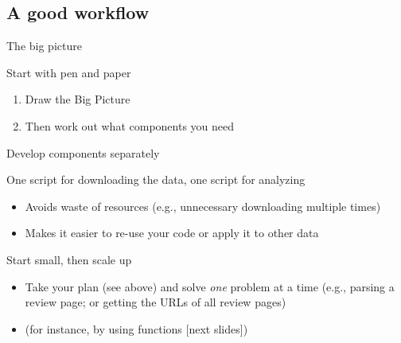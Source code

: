 \begin{frame}[plain]
\end{frame}

\subsection{A good workflow}




\begin{frame}{The big picture}
	\begin{block}{Start with pen and paper}
		\begin{enumerate}[<+->]
			\item Draw the Big Picture
			\item Then work out what components you need
		\end{enumerate}
	\end{block}
\end{frame}




\begin{frame}{Develop components separately}
	\begin{block}{One script for downloading the data, one script for analyzing}
		\begin{itemize}[<+->]
			\item Avoids waste of resources (e.g., unnecessary downloading multiple times)
			\item Makes it easier to re-use your code or apply it to other data
		\end{itemize}
	\end{block}
	\pause
	\begin{block}{Start small, then scale up}
		\begin{itemize}[<+->]
			\item Take your plan (see above) and solve \textit{one} problem at a time (e.g., parsing a review page; or getting the URLs of all review pages)
			\item (for instance, by using functions [next slides])
		\end{itemize}
	\end{block}
	
\end{frame}	


